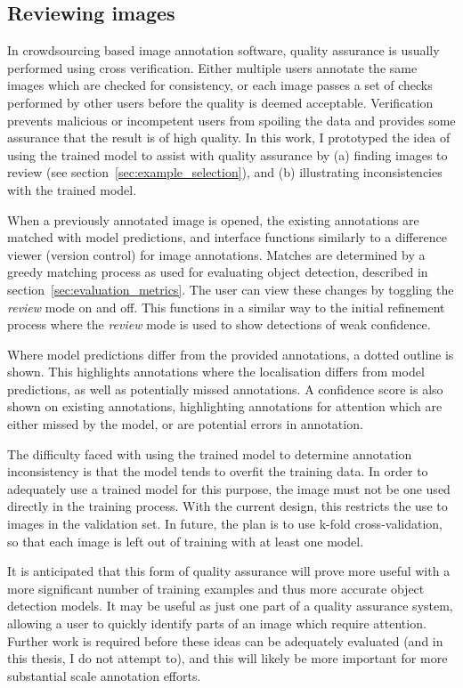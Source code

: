 \subsection{Reviewing images}
\label{sec:reviewing}

In crowdsourcing based image annotation software, quality assurance is usually performed using cross verification. Either multiple users annotate the same images which are checked for consistency, or each image passes a set of checks performed by other users before the quality is deemed acceptable. Verification prevents malicious or incompetent users from spoiling the data and provides some assurance that the result is of high quality. In this work, I prototyped the idea of using the trained model to assist with quality assurance by (a) finding images to review (see section~\ref{sec:example_selection}), and (b) illustrating inconsistencies with the trained model.

When a previously annotated image is opened, the existing annotations are matched with model predictions, and interface functions similarly to a difference viewer (version control) for image annotations. Matches are determined by a greedy matching process as used for evaluating object detection, described in section~\ref{sec:evaluation_metrics}. The user can view these changes by toggling the \emph{review} mode on and off. This functions in a similar way to the initial refinement process where the \emph{review} mode is used to show detections of weak confidence. 

Where model predictions differ from the provided annotations, a dotted outline is shown. This highlights annotations where the localisation differs from model predictions, as well as potentially missed annotations. A confidence score is also shown on existing annotations, highlighting annotations for attention which are either missed by the model, or are potential errors in annotation.

The difficulty faced with using the trained model to determine annotation inconsistency is that the model tends to overfit the training data. In order to adequately use a trained model for this purpose, the image must not be one used directly in the training process. With the current design, this restricts the use to images in the validation set. In future, the plan is to use k-fold cross-validation, so that each image is left out of training with at least one model. 

It is anticipated that this form of quality assurance will prove more useful with a more significant number of training examples and thus more accurate object detection models. It may be useful as just one part of a quality assurance system, allowing a user to quickly identify parts of an image which require attention. Further work is required before these ideas can be adequately evaluated (and in this thesis, I do not attempt to), and this will likely be more important for more substantial scale annotation efforts.

